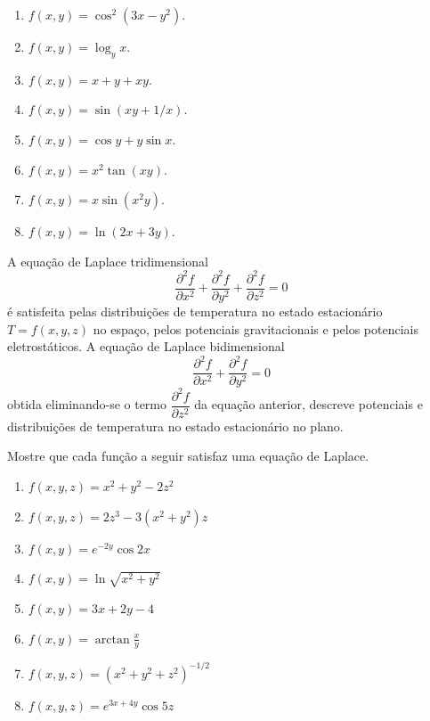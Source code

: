 \documentclass[11pt,a4paper]{article}
\begin{document}
\begin{enumerate}
\begin{enumerate}
			
			\item $f(x,y) = \cos^2 (3x - y^2)$.
			\item $f(x,y) = \log_y x$.
			\item $f(x,y) = x + y + xy$.
			\item $f(x,y) = \sin (xy + 1/x)$.
			\item $f(x,y) = \cos y + y\sin x$.
			\item $f(x,y) = x^2 \tan (xy)$.
			\item $f(x,y) = x\sin (x^2y)$.
			\item $f(x,y) = \ln (2x + 3y)$.
			
			
			
			
			
			
			
			
			
			
			
		\end{enumerate}
		
		 A equação de Laplace
		tridimensional 
		$$\dfrac{\partial^2 f}{\partial x^2} +\dfrac{\partial^2 f}{\partial y^2} + \dfrac{\partial^2 f}{\partial z^2} = 0$$
		é satisfeita pelas distribuições de temperatura no estado estacionário $T = f(x,y,z)$ no espaço, 				pelos potenciais gravitacionais e pelos potenciais eletrostáticos. A equação de Laplace 						bidimensional
		$$\dfrac{\partial^2 f}{\partial x^2} +\dfrac{\partial^2 f}{\partial y^2} = 0$$
		obtida eliminando-se o termo $\dfrac{\partial^2 f}{\partial z^2}$ da equação anterior, descreve
	    potenciais e distribuições de temperatura no estado estacionário no
		plano.
		
		Mostre que cada função a seguir satisfaz uma equação de Laplace.
		
		\begin{enumerate}
			\item $f(x,y,z) = x^2 + y^2 - 2z^2$
		\item $f(x,y,z) = 2z^3 - 3(x^2 + y^2)z$
			\item $f(x,y) = e^{-2y}\cos 2x$
			\item $f(x,y) = \ln \sqrt{x^2 + y^2}$
		\item $f(x,y) = 3x + 2y - 4$
			\item $f(x,y) = \arctan \displaystyle\frac{x}{y} $
			\item $f(x,y,z) = (x^2 + y^2 + z^2)^{-1/2}$
			\item $f(x,y,z) = e^{3x + 4y} \cos 5z$
			
			
			
			
			

\end{enumerate}
\end{enumerate}
\end{document}
